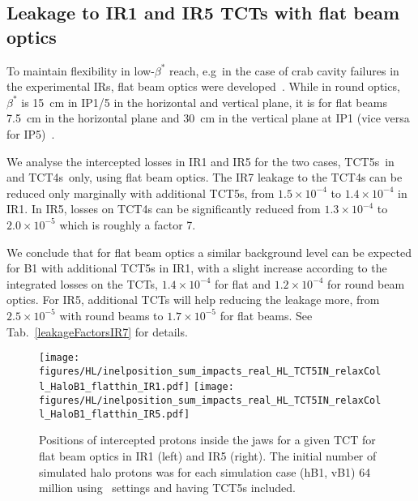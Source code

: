 
\subsection{Leakage to IR1 and IR5 TCTs with flat beam optics}

To maintain flexibility in low-$\beta^*$ reach, e.g~in the case of crab cavity failures in the experimental IRs, flat beam optics were developed~\cite{flatOpticsRef}. While in round optics, $\beta^*$ is 15~cm in IP1/5 in the horizontal and vertical plane, it is for flat beams 7.5~cm in the horizontal plane and 30~cm in the vertical plane at IP1 (vice versa for IP5)~\cite{opticsWebRef}. 

We analyse the intercepted losses in IR1 and IR5 for the two cases, TCT5s~in and TCT4s~only, using flat beam optics. The IR7 leakage to the TCT4s can be reduced only marginally with additional TCT5s, from $1.5 \times 10^{-4}$ to $1.4 \times 10^{-4}$ in IR1. In IR5, losses on TCT4s can be significantly reduced from $1.3 \times 10^{-4}$ to $2.0 \times 10^{-5}$ which is roughly a factor 7. 

We conclude that for flat beam optics a similar background level can be expected for B1 with additional TCT5s in IR1, with a slight increase according to the integrated losses on the TCTs, $1.4 \times 10^{-4}$ for flat and $1.2 \times 10^{-4}$ for round beam optics. For IR5, additional TCTs will help reducing the leakage more, from $2.5 \times 10^{-5}$ with round beams to $1.7 \times 10^{-5}$ for flat beams. See Tab.~\ref{leakageFactorsIR7} for details.


\begin{figure}%
\begin{center}
  \texttt{[image: figures/HL/inelposition\_sum\_impacts\_real\_HL\_TCT5IN\_relaxColl\_HaloB1\_flatthin\_IR1.pdf]}
  \texttt{[image: figures/HL/inelposition\_sum\_impacts\_real\_HL\_TCT5IN\_relaxColl\_HaloB1\_flatthin\_IR5.pdf]}
\end{center}
 \caption{Positions of intercepted protons inside the jaws for a given TCT for flat beam optics in IR1 (left) and IR5 (right). The initial number of simulated halo protons was for each simulation case (hB1, vB1) 64 million using \twosigmaret~settings and having TCT5s included.
   \label{fig:inelflat}}
\end{figure}

